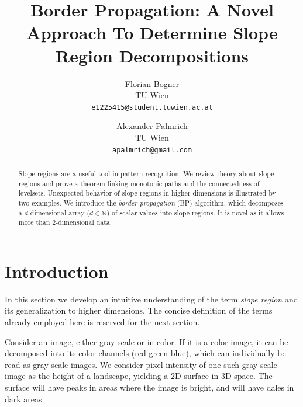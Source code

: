 \documentclass[11pt,twoside,twocolumn,a4paper]{article}
\theoremstyle{plain}
\theoremstyle{definition}
\begin{document}
\title{Border Propagation: A Novel Approach To Determine Slope Region Decompositions}


\author{Florian Bogner\\
TU Wien\\
{\tt\small e1225415@student.tuwien.ac.at}
\and
Alexander Palmrich\\
TU Wien\\
{\tt\small apalmrich@gmail.com}
}


\maketitle
\ifacvrwfinal\thispagestyle{fancy}\fi


\begin{abstract}
Slope regions are a useful tool in pattern recognition. We review theory about slope regions and prove a theorem linking monotonic paths and the connectedness of levelsets. Unexpected behavior of slope regions in higher dimensions is illustrated by two examples. We introduce the \emph{border propagation} (BP) algorithm, which decomposes a $d$-dimensional array ($d \in \mathbb N$) of scalar values into slope regions. It is novel as it allows more than 2-dimensional data.
\end{abstract}



\section{Introduction}
\label{sec:motivating_slope_regions}

In this section we develop an intuitive understanding of the term \emph{slope region} \cite{kropatsch2019computing} and its generalization to  higher dimensions.
The concise definition of the terms already employed here is reserved for the next section.

Consider an image, either gray-scale or in color.
If it is a color image, it can be decomposed into its color channels (red-green-blue), which can individually be read as gray-scale images.
We consider pixel intensity of one such gray-scale image as the height of a landscape, yielding a 2D surface in 3D space.
The surface will have peaks in areas where the image is bright, and will have dales in dark areas.
\end{document}
